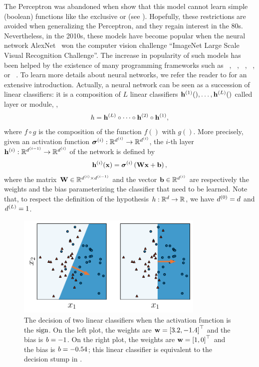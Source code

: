 The Perceptron was abandoned when \citet{MinskyPapert1972} show that this model cannot learn simple (boolean) functions like the exclusive or (see ).
Hopefully, these restrictions are avoided when generalizing the Perceptron, and they regain interest in the 80s.
Nevertheless, in the 2010s, these models have become popular when the neural network AlexNet~\citep{KrizhevskySutskeverHinton2012} won the computer vision challenge ``ImageNet Large Scale Visual Recognition Challenge''.
The increase in popularity of such models has been helped by the existence of many programming frameworks such as \torch~\citep{CollobertKavukcuogluFarabet2011}, \tensorflow~\citep{Abadi2015}, \theano~\citep{AlRfou2016}, \jax~\citep{FrostigJohnsonLeary2018,Bradbury2018}, or \pytorch~\citep{Paszke2019}.
To learn more details about neural networks, we refer the reader to \citet{GoodfellowBengioCourville2016} for an extensive introduction.
Actually, a neural network can be seen as a succession of linear classifiers: it is a composition of $L$ linear classifiers $\mathbf{h}^{(1)}(),\dots, \mathbf{h}^{(L)}()$ called layer or module, \ie,
\begin{align*}
    h = \mathbf{h}^{(L)}\circ\dots\circ\mathbf{h}^{(2)}\circ\mathbf{h}^{(1)},
\end{align*}
where $f\circ g$ is the composition of the function $f()$ with $g()$.
More precisely, given an activation function $\boldsymbol{\sigma}^{(i)}: \mathbb{R}^{d^{(i)}} \to \mathbb{R}^{d^{(i)}}$, the $i$-th layer $\mathbf{h}^{(i)}: \mathbb{R}^{d^{(i-1)}} \to \mathbb{R}^{d^{(i)}}$ of the network is defined by
\begin{align*}
    \mathbf{h}^{(i)}(\mathbf{x}) = \boldsymbol{\sigma}^{(i)}\left( \mathbf{W}\mathbf{x} + \mathbf{b} \right),
\end{align*}
where the matrix $\mathbf{W}\in\mathbb{R}^{d^{(i)}\times d^{(i-1)}}$ and the vector $\mathbf{b} \in \mathbb{R}^{d^{(i)}}$ are respectively the weights and the bias parameterizing the classifier that need to be learned.
Note that, to respect the definition of the hypothesis $h:\mathbb{R}^d\to \mathbb{R}$, we have $d^{(0)}=d$ and $d^{(L)}=1$.

\begin{figure}
    \centering
    \includegraphics[width=0.8\textwidth]{chapter_1/figures/linear_classifier.pdf}
    \caption[Examples of Linear Classifiers]{
    The decision of two linear classifiers when the activation function is the $\operatorname{sign}$. 
    On the left plot, the weights are $\mathbf{w}=\left[3.2, -1.4\right]^\top$ and the bias is $b=-1$.
    On the right plot, the weights are $\mathbf{w}=\left[1, 0\right]^\top$ and the bias is $b=-0.54$; this linear classifier is equivalent to the decision stump in .
    }
    \label{chap:intro:fig:linear}
\end{figure}

